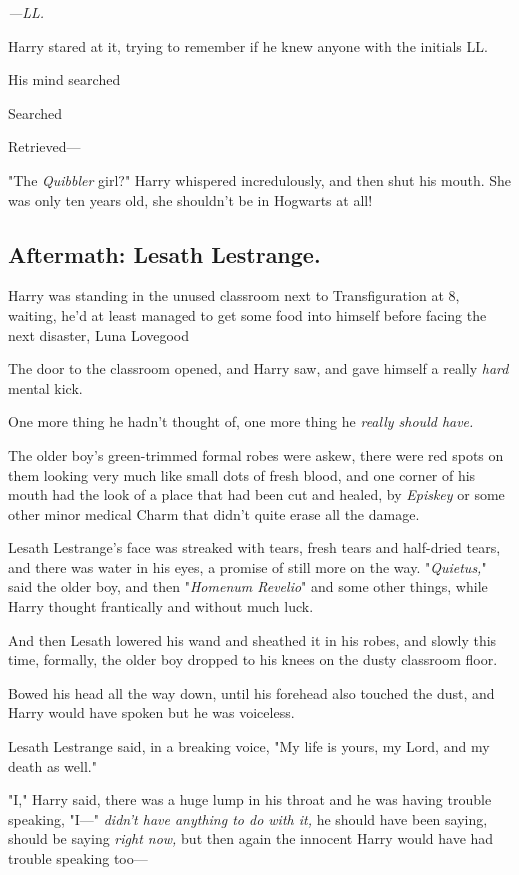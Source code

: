 \emph{—LL.}

Harry stared at it, trying to remember if he knew anyone with the initials LL.

His mind searched{\el}

Searched{\el}

Retrieved—

"The \emph{Quibbler} girl?" Harry whispered incredulously, and then shut his
mouth. She was only ten years old, she shouldn't be in Hogwarts at all!
\sbreak
\vspace{-2\baselineskip}
\subsection{Aftermath: Lesath Lestrange.}

Harry was standing in the unused classroom next to Transfiguration at 8\AM,
waiting, he'd at least managed to get some food into himself before facing the
next disaster, Luna Lovegood{\el}

The door to the classroom opened, and Harry saw, and gave himself a really
\emph{hard} mental kick.

One more thing he hadn't thought of, one more thing he \emph{really should
have.}

The older boy's green-trimmed formal robes were askew, there were red spots on
them looking very much like small dots of fresh blood, and one corner of his
mouth had the look of a place that had been cut and healed, by \emph{Episkey}
or some other minor medical Charm that didn't quite erase all the damage.

Lesath Lestrange's face was streaked with tears, fresh tears and half-dried
tears, and there was water in his eyes, a promise of still more on the way.
"\emph{Quietus,}" said the older boy, and then "\emph{Homenum Revelio}" and
some other things, while Harry thought frantically and without much luck.

And then Lesath lowered his wand and sheathed it in his robes, and slowly this
time, formally, the older boy dropped to his knees on the dusty classroom floor.

Bowed his head all the way down, until his forehead also touched the dust, and
Harry would have spoken but he was voiceless.

Lesath Lestrange said, in a breaking voice, "My life is yours, my Lord, and my
death as well."

"I," Harry said, there was a huge lump in his throat and he was having trouble
speaking, "I—" \emph{didn't have anything to do with it,} he should have been
saying, should be saying \emph{right now,} but then again the innocent Harry
would have had trouble speaking too—

